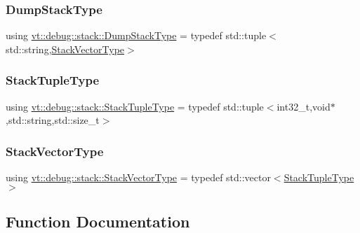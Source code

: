 \subsubsection{\texorpdfstring{Dump\+Stack\+Type}{DumpStackType}}
{\footnotesize\ttfamily using \hyperlink{namespacevt_1_1debug_1_1stack_a68d963f7e74664a123681e231d7913d9}{vt\+::debug\+::stack\+::\+Dump\+Stack\+Type} = typedef std\+::tuple$<$std\+::string,\hyperlink{namespacevt_1_1debug_1_1stack_a29a3bbd4c51f20720ef437f124de9b62}{Stack\+Vector\+Type}$>$}

\mbox{\label{namespacevt_1_1debug_1_1stack_afc0b70e5a3c0f073815eed49a09cebba}} 
\subsubsection{\texorpdfstring{Stack\+Tuple\+Type}{StackTupleType}}
{\footnotesize\ttfamily using \hyperlink{namespacevt_1_1debug_1_1stack_afc0b70e5a3c0f073815eed49a09cebba}{vt\+::debug\+::stack\+::\+Stack\+Tuple\+Type} = typedef std\+::tuple$<$int32\+\_\+t,void$\ast$,std\+::string,std\+::size\+\_\+t$>$}

\mbox{\label{namespacevt_1_1debug_1_1stack_a29a3bbd4c51f20720ef437f124de9b62}} 
\subsubsection{\texorpdfstring{Stack\+Vector\+Type}{StackVectorType}}
{\footnotesize\ttfamily using \hyperlink{namespacevt_1_1debug_1_1stack_a29a3bbd4c51f20720ef437f124de9b62}{vt\+::debug\+::stack\+::\+Stack\+Vector\+Type} = typedef std\+::vector$<$\hyperlink{namespacevt_1_1debug_1_1stack_afc0b70e5a3c0f073815eed49a09cebba}{Stack\+Tuple\+Type}$>$}



\subsection{Function Documentation}
\mbox{\label{namespacevt_1_1debug_1_1stack_a89827f4a5411b18eb8fd0ea41d7b869d}} 
